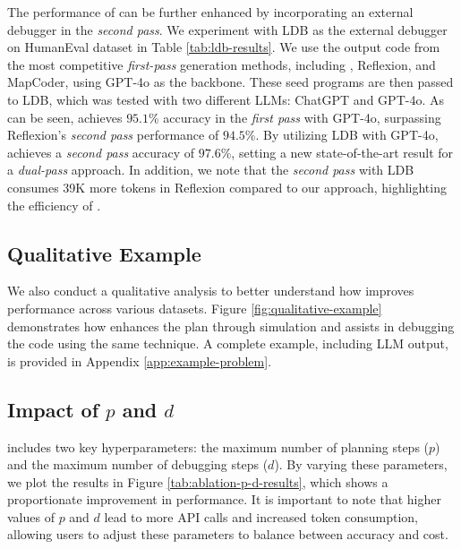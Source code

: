 

\noindent
The performance of \tool can be further enhanced by incorporating an external debugger in the \emph{second pass}. We experiment with LDB as the external debugger on HumanEval dataset in Table \ref{tab:ldb-results}. We use the output code from the most competitive \emph{first-pass} generation methods, including \toolnospace, Reflexion, and MapCoder, using GPT-4o as the backbone. These seed programs are then passed to LDB, which was tested with two different LLMs: ChatGPT and GPT-4o. As can be seen, \tool achieves $95.1$\% accuracy in the \emph{first pass} with GPT-4o, surpassing Reflexion's \emph{second pass} performance of $94.5$\%.  By utilizing LDB with GPT-4o, \tool achieves a \emph{second pass} accuracy of $97.6$\%, setting a new state-of-the-art result for a \emph{dual-pass} approach. In addition, we note that the \emph{second pass} with LDB consumes 39K more tokens in Reflexion compared to our approach, highlighting the efficiency  of \toolnospace.



\subsection{Qualitative Example}
We also conduct a qualitative analysis to better understand how \tool improves performance across various datasets. Figure \ref{fig:qualitative-example} demonstrates how \tool enhances the plan through simulation and assists in debugging the code using the same technique. A complete example, including LLM output, is provided in Appendix \ref{app:example-problem}.

\subsection{Impact of $p$ and $d$}
\tool includes two key hyperparameters: the maximum number of planning steps ($p$) and the maximum number of debugging steps ($d$). By varying these parameters, we plot the results in Figure \ref{tab:ablation-p-d-results}, which shows a proportionate improvement in performance. It is important to note that higher values of $p$ and $d$ lead to more API calls and increased token consumption, allowing users to adjust these parameters to balance between accuracy and cost.


